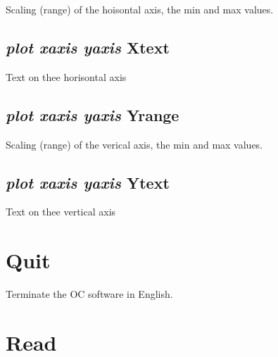 \documentclass[12pt]{article}
\begin{document}
Scaling (range) of the hoisontal axis, the min and max values.

\subsection{{\em plot xaxis yaxis} Xtext}

Text on thee horisontal axis

\subsection{{\em plot xaxis yaxis} Yrange}

Scaling (range) of the verical axis, the min and max values.

\subsection{{\em plot xaxis yaxis} Ytext}

Text on thee vertical axis

\section{Quit }

Terminate the OC software in English.

\section{Read }
\end{document}
